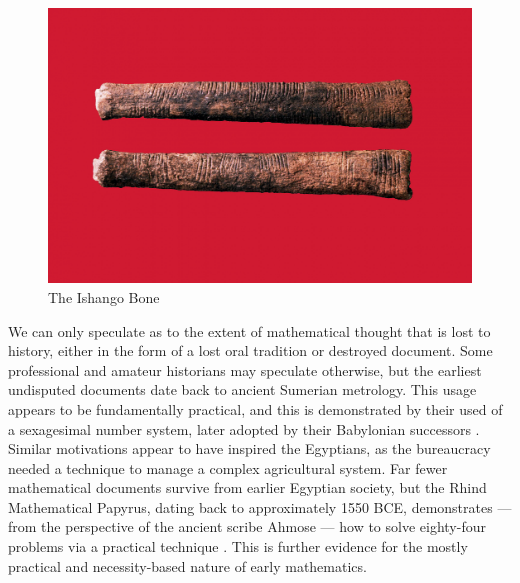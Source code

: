 \documentclass[12pt]{article}
\begin{document}
\begin{figure}
	\includegraphics[scale=0.28]{ishango.png}
	\centering
	\caption{The Ishango Bone \cite{ishango}}
	\label{fig1}
\end{figure}

We can only speculate
as to the extent of mathematical thought
that is lost to history,
either in the form of a lost oral tradition
or destroyed document.
Some professional and amateur historians
may speculate otherwise,
but the earliest undisputed documents
date back to ancient Sumerian metrology.
This usage appears to be fundamentally practical,
and this is demonstrated by their used of
a sexagesimal number system,
later adopted by their Babylonian successors \cite{boyer1991}.
Similar motivations appear to have inspired the Egyptians,
as the bureaucracy needed a technique
to manage a complex agricultural system.
Far fewer mathematical documents survive
from earlier Egyptian society,
but the Rhind Mathematical Papyrus,
dating back to approximately 1550 BCE,
demonstrates --- from the perspective of
the ancient scribe Ahmose ---
how to solve eighty-four problems
via a practical technique \cite{rhind}.
This is further evidence for the mostly
practical and necessity-based nature
of early mathematics.



\end{document}
